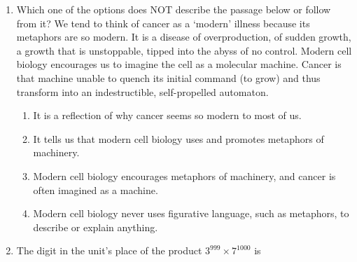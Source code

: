 \documentclass[12pt]{article}
\theoremstyle{remark}
\begin{document}
\begin{enumerate}
\begin{centering}
\begin{figure}
\caption{}
\label{Fig:1.2}
\end{figure}
\end{centering}
\begin{enumerate}  \end{enumerate}
\hfill{}
\item Which one of the options does NOT describe the passage below or follow from it? 
 We tend to think of cancer as a ‘modern’ illness because its metaphors are so modern. It is a disease of overproduction, of sudden growth, a growth that is unstoppable, tipped into the abyss of no control. Modern cell biology encourages us to imagine the cell as a molecular machine. Cancer is that machine unable to quench its initial command (to grow) and thus transform into an indestructible, self-propelled automaton.\\
\begin{enumerate}
\item   It is a reflection of why cancer seems so modern to most of us. 
\item   It tells us that modern cell biology uses and promotes metaphors of machinery. 
\item   Modern cell biology encourages metaphors of machinery, and cancer is often imagined as a machine. 
\item   Modern cell biology never uses figurative language, such as metaphors, to describe or explain anything. 
\end{enumerate}
\hfill{}
\item The digit in the unit’s place of the product $3^{999} \times 7^{1000}$ is \\ 
\begin{enumerate}  \end{enumerate}

\end{enumerate}
\end{document}

